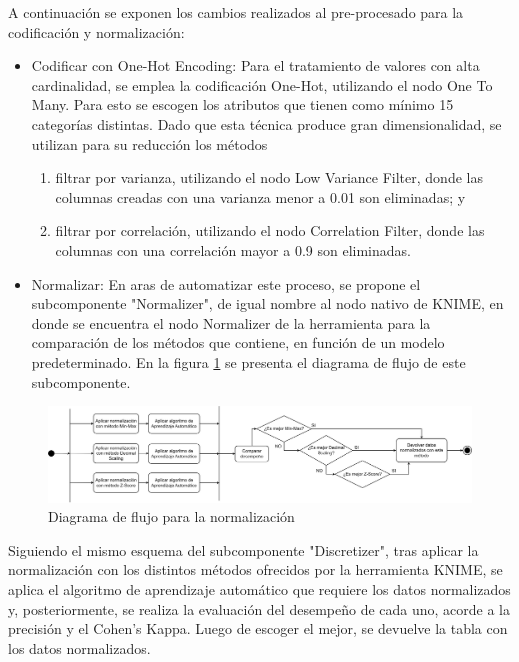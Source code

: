 A continuación se exponen los cambios realizados al pre-procesado para la codificación y normalización:

\begin{itemize}
	\item Codificar con One-Hot Encoding: Para el tratamiento de valores con alta cardinalidad, se emplea la codificación One-Hot, utilizando el nodo One To Many. Para esto se escogen los atributos que tienen como mínimo 15 categorías distintas. Dado que esta técnica produce gran dimensionalidad, se utilizan para su reducción los métodos
	\begin{enumerate}
		\item filtrar por varianza, utilizando el nodo Low Variance Filter, donde las columnas creadas con una varianza menor a 0.01 son eliminadas; y 
		\item filtrar por correlación, utilizando el nodo Correlation Filter, donde las columnas con una correlación mayor a 0.9 son eliminadas.
	\end{enumerate}
	\item Normalizar: En aras de automatizar este proceso, se propone el subcomponente "Normalizer", de igual nombre al nodo nativo de KNIME, en donde se encuentra el nodo Normalizer de la herramienta para la comparación de los métodos que contiene, en función de un modelo predeterminado. En la figura \ref{fig:normalizacion} se presenta el diagrama de flujo de este subcomponente. 
\end{itemize}


\begin{figure}[H]
	\centering
	\includegraphics[width=1\linewidth]{"figuras/capi 2/preprocesado/normalizacion.drawio"}
	\caption{Diagrama de flujo para la normalización}
	\label{fig:normalizacion}
\end{figure}

Siguiendo el mismo esquema del subcomponente "Discretizer", tras aplicar la normalización con los distintos métodos ofrecidos por la herramienta KNIME, se aplica el algoritmo de aprendizaje automático que requiere los datos normalizados y, posteriormente, se realiza la evaluación del desempeño de cada uno, acorde a la precisión y el Cohen's Kappa. Luego de escoger el mejor, se devuelve la tabla con los datos normalizados.



